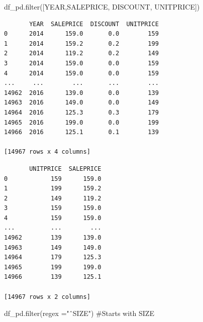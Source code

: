 \documentclass[
  letterpaper,
  DIV=11,
  numbers=noendperiod]{scrreprt}
\newenvironment{Shaded}{\begin{snugshade}}{\end{snugshade}}
\newcommand{\BuiltInTok}[1]{\textcolor[rgb]{0.00,0.23,0.31}{#1}}
\newcommand{\CommentTok}[1]{\textcolor[rgb]{0.37,0.37,0.37}{#1}}
\newcommand{\NormalTok}[1]{\textcolor[rgb]{0.00,0.23,0.31}{#1}}
\newcommand{\OperatorTok}[1]{\textcolor[rgb]{0.37,0.37,0.37}{#1}}
\newcommand{\StringTok}[1]{\textcolor[rgb]{0.13,0.47,0.30}{#1}}
\begin{document}
\begin{Shaded}
\begin{Highlighting}[]
\NormalTok{df\_pd.}\BuiltInTok{filter}\NormalTok{([}\StringTok{\textquotesingle{}YEAR\textquotesingle{}}\NormalTok{,}\StringTok{\textquotesingle{}SALEPRICE\textquotesingle{}}\NormalTok{, }\StringTok{\textquotesingle{}DISCOUNT\textquotesingle{}}\NormalTok{, }\StringTok{\textquotesingle{}UNITPRICE\textquotesingle{}}\NormalTok{])}
\end{Highlighting}
\end{Shaded}

\begin{verbatim}
       YEAR  SALEPRICE  DISCOUNT  UNITPRICE
0      2014      159.0       0.0        159
1      2014      159.2       0.2        199
2      2014      119.2       0.2        149
3      2014      159.0       0.0        159
4      2014      159.0       0.0        159
...     ...        ...       ...        ...
14962  2016      139.0       0.0        139
14963  2016      149.0       0.0        149
14964  2016      125.3       0.3        179
14965  2016      199.0       0.0        199
14966  2016      125.1       0.1        139

[14967 rows x 4 columns]
\end{verbatim}

\begin{Shaded}
\end{Shaded}

\begin{verbatim}
       UNITPRICE  SALEPRICE
0            159      159.0
1            199      159.2
2            149      119.2
3            159      159.0
4            159      159.0
...          ...        ...
14962        139      139.0
14963        149      149.0
14964        179      125.3
14965        199      199.0
14966        139      125.1

[14967 rows x 2 columns]
\end{verbatim}

\begin{Shaded}
\begin{Highlighting}[]
\NormalTok{df\_pd.}\BuiltInTok{filter}\NormalTok{(regex }\OperatorTok{=}\StringTok{"ˆSIZE"}\NormalTok{) }\CommentTok{\#Starts with SIZE}
\end{Highlighting}
\end{Shaded}
\end{document}
